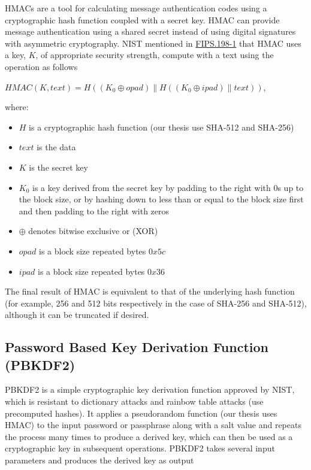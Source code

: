 HMACs are a tool for calculating message authentication codes using a cryptographic hash function coupled with a secret key. HMAC can provide message authentication using a shared secret instead of using digital signatures with asymmetric cryptography. NIST mentioned in \href{https://nvlpubs.nist.gov/nistpubs/FIPS/NIST.FIPS.198-1.pdf}{FIPS.198-1} that HMAC uses a key, $K$, of appropriate security strength, compute with a text using the operation as follows

\begin{center}
  $HMAC(K, text) = H((K_0 \oplus opad )\| H((K_0 \oplus ipad) \| text))$,
\end{center}

where:

\begin{itemize}
  \item $H$ is a cryptographic hash function (our thesis use SHA-512 and SHA-256)
  \item $text$ is the data
  \item $K$ is the secret key
  \item $K_0$ is a key derived from the secret key by padding to the right with 0s up to the block size, or by hashing down to less than or equal to the block size first and then padding to the right with zeros
  \item $\oplus$ denotes bitwise exclusive or (XOR)
  \item $opad$ is a block size repeated bytes $0x5c$
  \item $ipad$ is a block size repeated bytes $0x36$
\end{itemize}

The final result of HMAC is equivalent to that of the underlying hash function (for example, 256 and 512 bits respectively in the case of SHA-256 and SHA-512), although it can be truncated if desired.

\subsection{Password Based Key Derivation Function (PBKDF2)}

PBKDF2 is a simple cryptographic key derivation function approved by NIST, which is resistant to dictionary attacks and rainbow table attacks (use precomputed hashes). It applies a pseudorandom function (our thesis uses HMAC) to the input password or passphrase along with a salt value and repeats the process many times to produce a derived key, which can then be used as a cryptographic key in subsequent operations. PBKDF2 takes several input parameters and produces the derived key as output

